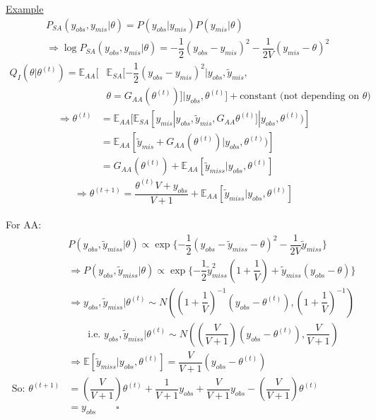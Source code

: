 \documentclass[12pt]{article}
\begin{document}
\begin{flushleft}
\bigskip
\underline{Example}
\begin{align*}
&P_{SA}(y_{obs},y_{mis}|\theta) = P(y_{obs}|y_{mis})P(y_{mis}|\theta)\\
&\Longrightarrow \log P_{SA}(y_{obs},y_{mis}|\theta)= -\dfrac{1}{2}(y_{obs}-y_{mis})^2-\dfrac{1}{2V}(y_{mis}-\theta)^2
\end{align*}
\begin{equation*} 
\begin{split} 
Q_I(\theta|\theta^{(t)})=\mathbb{E}_{AA}[ & \mathbb{E}_{SA}[-\dfrac{1}{2}(y_{obs}-y_{mis})^2|y_{obs}, \tilde{y}_{mis}, \\
& \theta=G_{AA}(\theta^{(t)})]| y_{obs}, \theta^{(t)}] + \text{constant (not depending on  $\theta$)} 
\end{split}
\end{equation*}
\begin{align*}
\Longrightarrow \theta^{(t)} &= \mathbb{E}_{AA}[\mathbb{E}_{SA}[y_{mis}|y_{obs},\tilde{y}_{mis},G_{AA}\theta^{(t)}]|y_{obs}, \theta^{(t)})]\\
& = \mathbb{E}_{AA}[\tilde{y}_{mis}+G_{AA}(\theta^{(t)})|y_{obs},\theta^{(t)})]\\
& = G_{AA}(\theta^{(t)})+ \mathbb{E}_{AA}[\tilde{y}_{miss}|y_{obs},\theta^{(t)}]
\end{align*}
\begin{equation*}
\Longrightarrow \theta^{(t+1)}= \dfrac{ \theta^{(t)}V+y_{obs}}{V+1}+\mathbb{E}_{AA}[\tilde{y}_{miss}|y_{obs},\theta^{(t)}]
\end{equation*}\\
\bigskip
For AA:
\begin{align*}
& P(y_{obs},\tilde{y}_{miss}|\theta)\propto \exp \{-\dfrac{1}{2}(y_{obs}-\tilde{y}_{miss}-\theta)^2-\dfrac{1}{2V}\tilde{y}_{miss}\}\\
& \Longrightarrow P(y_{obs},\tilde{y}_{miss}|\theta)\propto \exp \{ -\dfrac{1}{2}\tilde{y}_{miss}^2(1+\dfrac{1}{V})+ \tilde{y}_{miss}(y_{obs}-\theta) \}\\
& \Longrightarrow y_{obs},\tilde{y}_{miss}|\theta^{(t)} \sim N((1+\dfrac{1}{V})^{-1}(y_{obs}-\theta^{(t)}), (1+\dfrac{1}{V})^{-1})\\
& \qquad \text{i.e. }  y_{obs},\tilde{y}_{miss}|\theta^{(t)} \sim N((\dfrac{V}{V+1})(y_{obs}-\theta^{(t)}), \dfrac{V}{V+1})\\
& \Longrightarrow \mathbb{E}[\tilde{y}_{miss}|y_{obs},\theta^{(t)}]=\dfrac{V}{V+1}(y_{obs}-\theta^{(t)})\\
\text{So: } \theta^{(t+1)}&=(\dfrac{V}{V+1}) \theta^{(t)}+\dfrac{1}{V+1}y_{obs}+\dfrac{V}{V+1}y_{obs}-(\dfrac{V}{V+1}) \theta^{(t)}\\
& = y_{obs} \qquad  \square
\end{align*}


\end{flushleft}
\end{document}

